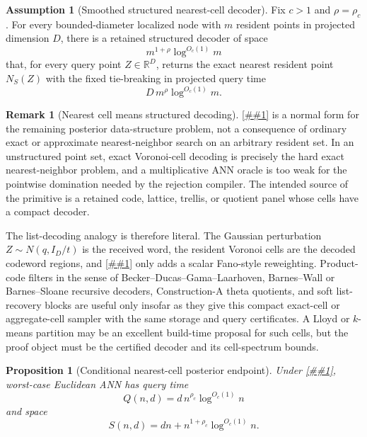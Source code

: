 \documentclass[10pt]{article}
\newcommand{\cref}[1]{\ref{##1}}
\newcommand{\Cref}[1]{\ref{##1}}
\newtheorem{proposition}[theorem]{Proposition}
\theoremstyle{definition}
\newtheorem{remark}[theorem]{Remark}
\newtheorem{assumption}[theorem]{Assumption}
\begin{document}
\begin{assumption}[Smoothed structured nearest-cell decoder]
   \label{asm:smoothed-nearest-cell}
   Fix \(c>1\) and \(\rho=\rho_c\).  For every bounded-diameter localized node
   with \(m\) resident points in projected dimension \(D\), there is a retained
   structured decoder of space
   \[
      m^{1+\rho}\log^{O_c(1)}m
   \]
   that, for every query point \(Z\in\mathbb R^D\), returns the exact nearest
   resident point \(N_S(Z)\) with the fixed tie-breaking in projected query
   time
   \[
      D\,m^\rho\log^{O_c(1)}m .
   \]
\end{assumption}

\begin{remark}[Nearest cell means structured decoding]
   \label{rem:nearest-cell-structured-decoding}
   \Cref{asm:smoothed-nearest-cell} is a normal form for the remaining
   posterior data-structure problem, not a consequence of ordinary exact or
   approximate nearest-neighbor search on an arbitrary resident set.  In an
   unstructured point set, exact Voronoi-cell decoding is precisely the hard
   exact nearest-neighbor problem, and a multiplicative ANN oracle is too weak
   for the pointwise domination needed by the rejection compiler.  The intended
   source of the primitive is a retained code, lattice, trellis, or quotient
   panel whose cells have a compact decoder.

   The list-decoding analogy is therefore literal.  The Gaussian perturbation
   \(Z\sim N(q,I_D/t)\) is the received word, the resident Voronoi cells are
   the decoded codeword regions, and \cref{cor:truncated-nearest-cell-compiler}
   only adds a scalar Fano-style reweighting.  Product-code filters in the
   sense of Becker--Ducas--Gama--Laarhoven, Barnes--Wall or Barnes--Sloane
   recursive decoders, Construction-A theta quotients, and soft list-recovery
   blocks are useful only insofar as they give this compact exact-cell or
   aggregate-cell sampler with the same storage and query certificates.  A
   Lloyd or \(k\)-means partition may be an excellent build-time proposal for
   such cells, but the proof object must be the certified decoder and its
   cell-spectrum bounds.
\end{remark}

\begin{proposition}[Conditional nearest-cell posterior endpoint]
   \label{prop:nearest-cell-polylog}
   Under \cref{asm:smoothed-nearest-cell}, worst-case Euclidean ANN has query
   time
   \[
      Q(n,d)=d\,n^{\rho_c}\log^{O_c(1)}n
   \]
   and space
   \[
      S(n,d)=dn+n^{1+\rho_c}\log^{O_c(1)}n .
   \]
\end{proposition}
\end{document}
